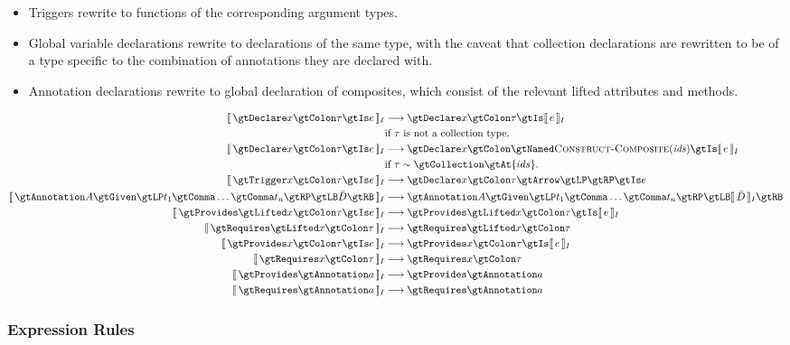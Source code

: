 \documentclass{article}
\begin{document}
    \begin{itemize}
        \item Triggers rewrite to functions of the corresponding argument types.
        \item Global variable declarations rewrite to declarations of the same type, with the caveat
            that collection declarations are rewritten to be of a type specific to the combination
            of annotations they are declared with.
        \item Annotation declarations rewrite to global declaration of composites, which consist of
            the relevant lifted attributes and methods.
    \end{itemize}
%
    \begin{align*}
        \eqI{\gtDeclare x \gtColon \tau \gtIs e}
            {\gtDeclare x \gtColon \tau \gtIs \intI{e}}
            {if $\tau$ is not a collection type.} \\
        \eqI{\gtDeclare x \gtColon \tau \gtIs e}
            {\gtDeclare x \gtColon \gtNamed \ConstructComposite{ids} \gtIs \intI{e}}
            {if $\tau \sim \gtCollection \gtAt \{ids\}$.} \\
        \eqI{\gtTrigger x \gtColon \tau \gtIs e}
            {\gtDeclare x \gtColon \tau \gtArrow \gtLP \gtRP \gtIs e}
            {} \\
        \eqI{\gtAnnotation A \gtGiven \gtLP t_1 \gtComma \ldots \gtComma t_n \gtRP \gtLB \bar{D} \gtRB}
            {\gtAnnotation A \gtGiven \gtLP t_1 \gtComma \ldots \gtComma t_n \gtRP \gtLB \intI{\bar{D}} \gtRB}{} \\
        \eqI{\gtProvides \gtLifted x \gtColon \tau \gtIs e}
            {\gtProvides \gtLifted x \gtColon \tau \gtIs \intI{e}}{} \\
        \eqI{\gtRequires \gtLifted x \gtColon \tau}
            {\gtRequires \gtLifted x \gtColon \tau}{} \\
        \eqI{\gtProvides x \gtColon \tau \gtIs e}
            {\gtProvides x \gtColon \tau \gtIs \intI{e}}{} \\
        \eqI{\gtRequires x \gtColon \tau}
            {\gtRequires x \gtColon \tau}{} \\
        \eqI{\gtProvides \gtAnnotation a}
            {\gtProvides \gtAnnotation a}{} \\
        \eqI{\gtRequires \gtAnnotation a}
            {\gtRequires \gtAnnotation a}{}
    \end{align*}

    \subsubsection{Expression Rules}
\end{document}
